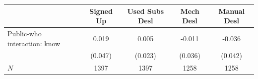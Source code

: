 \begin{tabular}{lcccc}
\hline\hline
 & Signed Up & Used Subs Desl & Mech Desl & Manual Desl \\
\hline
Public-who interaction: know & 0.019 & 0.005 & -0.011 & -0.036 \\
 & (0.047) & (0.023) & (0.036) & (0.042) \\
\hline
$N$ & 1397 & 1397 & 1258 & 1258 \\
\hline\hline
\end{tabular}

